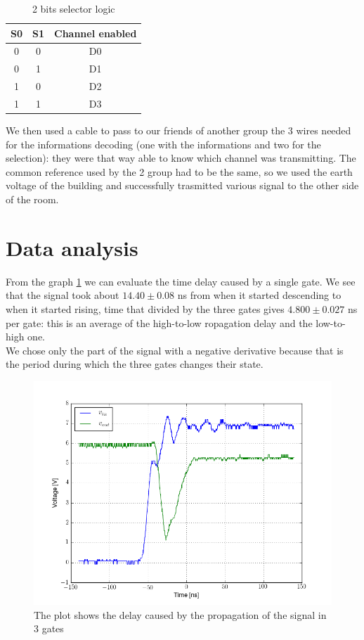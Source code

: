 \begin{table}[H]
\centering
\begin{tabular}{c|c|c}
 S0 & S1 & Channel enabled\\
 \hline
 0 & 0   & D0\\
 0 &1    &  D1\\
 1&0    & D2\\ 
 1 &1    &  D3\\ 
\end{tabular}\caption{2 bits selector logic}
\end{table}
We then used a cable to pass to our friends of another group the 3 wires needed for the informations decoding (one with the informations and two for the selection): they were that way able to know which channel was transmitting. The common reference used by the 2 group had to be the same, so we used the earth voltage of the building and successfully trasmitted various signal to the other side of the room. 

\section{Data analysis}
From the graph \ref{latency_plot} we can evaluate the time delay caused by a single gate. We see that the signal took about $14.40 \pm 0.08$ ns from when it started descending to when it started rising, time that divided by the three gates gives $4.800 \pm 0.027$ ns per gate: this is an average of the high-to-low ropagation delay and the low-to-high one.\\
We chose only the part of the signal with a negative derivative because that is the period during which the three gates changes their state.
\begin{figure}[H]
\centering
\includegraphics[width=.7\textwidth]{10/latency_plot.png}
\caption{The plot shows the delay caused by the propagation of the signal in 3 gates}\label{latency_plot}
\end{figure}
